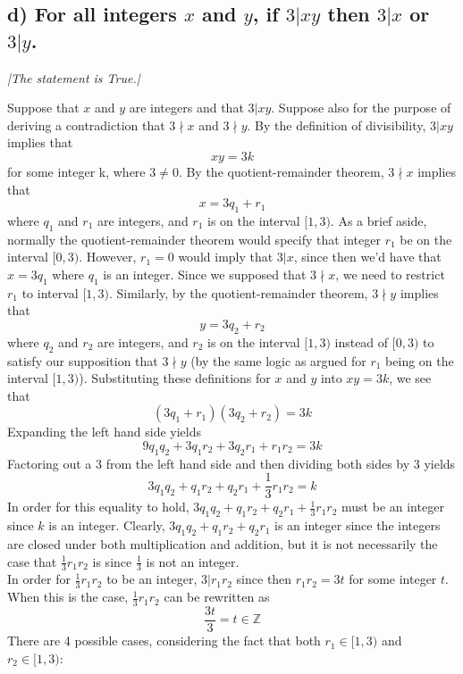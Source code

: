 \documentclass[11pt, letterpaper]{article}
\begin{document}
\subsection*{d) For all integers $x$ and $y$, if $3|xy$ then $3|x$ or $3|y$.}
{\large\it |The statement is True.|}
\begin{prf}[by contradiction]
    Suppose that $x$ and $y$ are integers and that $3|xy$. Suppose also for the purpose of deriving a contradiction 
    that $3\nmid x$ and $3\nmid y$. By the definition of divisibility, $3|xy$ implies that
    \[xy=3k\]
    for some integer k, where $3\neq 0$. By the quotient-remainder theorem, 
    $3\nmid x$ implies that 
    \[x=3q_{1}+r_{1}\]
    where $q_{1}$ and $r_{1}$ are integers, and $r_{1}$ is on the interval $[1, 3)$. 
    As a brief aside, normally the quotient-remainder theorem would specify that integer $r_{1}$ be on the interval $[0, 3)$.
    However, $r_{1}=0$ would imply that $3|x$, since then we'd have that $x=3q_{1}$ where $q_{1}$ is an integer. 
    Since we supposed that $3\nmid x$, we need to restrict $r_{1}$ to interval $[1, 3)$. 
    Similarly, by the quotient-remainder theorem, $3\nmid y$ implies that
    \[y=3q_{2}+r_{2}\] 
    where $q_{2}$ and $r_{2}$ are integers, and $r_{2}$ is on the interval $[1, 3)$ instead of $[0, 3)$ to satisfy our supposition that $3\nmid y$ 
    (by the same logic as argued for $r_{1}$ being on the interval $[1, 3)$). 
    Substituting these definitions for $x$ and $y$ into $xy=3k$, we see that
    \[(3q_{1}+r_{1})(3q_{2}+r_{2})=3k\]
    Expanding the left hand side yields
    \[9q_{1}q_{2}+3q_{1}r_{2}+3q_{2}r_{1}+r_{1}r_{2}=3k\]
    Factoring out a 3 from the left hand side and then dividing both sides by 3 yields
    \[3q_{1}q_{2}+q_{1}r_{2}+q_{2}r_{1}+\frac{1}{3}r_{1}r_{2}=k\]
    In order for this equality to hold, $3q_{1}q_{2}+q_{1}r_{2}+q_{2}r_{1}+\frac{1}{3}r_{1}r_{2}$ 
    must be an integer since $k$ is an integer. Clearly, $3q_{1}q_{2}+q_{1}r_{2}+q_{2}r_{1}$ 
    is an integer since the integers are closed under both multiplication and addition, but it is not 
    necessarily the case that $\frac{1}{3}r_{1}r_{2}$ is since $\frac{1}{3}$ is not an integer.\\[0.5cm]
    In order for $\frac{1}{3}r_{1}r_{2}$ to be an integer, $3|r_{1}r_{2}$ since then $r_{1}r_{2}=3t$
    for some integer $t$. When this is the case, $\frac{1}{3}r_{1}r_{2}$ can be rewritten as 
    \[\frac{3t}{3}=t\in \mathbb{Z}\]
    There are 4 possible cases, considering the fact that both $r_{1}\in [1,3)$ and 
    $r_{2}\in [1,3)$:
    \begin{enumerate}

\end{enumerate}
\end{prf}
\end{document}
